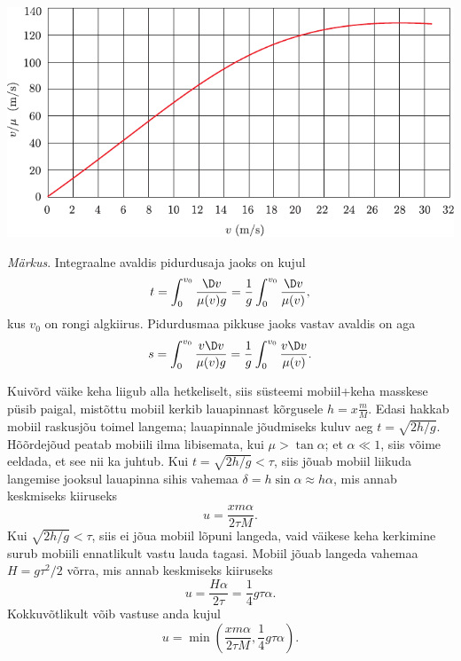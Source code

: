 \documentclass[10pt, twoside]{article}
\begin{document}
{\begin{center}
	\includegraphics[width=\linewidth]{2006-lahg-10-lah2}
\end{center}

\emph{Märkus}. Integraalne avaldis pidurdusaja jaoks on kujul
\[
t=\int_{0}^{v_{0}} \frac{\D v}{\mu(v) g}=\frac{1}{g} \int_{0}^{v_{0}} \frac{\D v}{\mu(v)},
\]
kus $v_0$ on rongi algkiirus. Pidurdusmaa pikkuse jaoks vastav avaldis on aga
\[
s=\int_{0}^{v_{0}} \frac{v \D v}{\mu(v) g}=\frac{1}{g} \int_{0}^{v_{0}} \frac{v \D v}{\mu(v)}.
\]
\probend
\bigskip


\solu
Kuivõrd väike keha liigub alla hetkeliselt, siis süsteemi mobiil+keha masskese püsib paigal, mistõttu mobiil kerkib lauapinnast kõrgusele $h=x\frac mM$.
Edasi hakkab mobiil raskusjõu toimel langema; lauapinnale jõudmiseks kuluv aeg $t=\sqrt{2h/g}$. Hõõrdejõud peatab mobiili ilma libisemata, kui $\mu>\tan\alpha$; et
$\alpha \ll 1$, siis võime eeldada, et see nii ka juhtub. Kui $t=\sqrt{2h/g}<\tau$, siis jõuab mobiil liikuda langemise jooksul lauapinna sihis vahemaa $\delta=h\sin\alpha\approx h\alpha$,
mis annab keskmiseks kiiruseks $$u=\frac{xm\alpha}{2\tau M}.$$ Kui $\sqrt{2h/g}<\tau$, siis ei jõua mobiil lõpuni langeda, vaid väikese keha kerkimine surub mobiili ennatlikult vastu lauda tagasi.
Mobiil jõuab langeda vahemaa $H=g\tau^2/2$ võrra, mis annab keskmiseks kiiruseks
$$u=\frac{H\alpha}{2\tau}=\frac 14 g\tau\alpha.$$
Kokkuvõtlikult võib vastuse anda kujul
$$u=\min\left(\frac{xm\alpha}{2\tau M}, \frac 14 g\tau\alpha\right).$$
\probend
\bigskip


}
\end{document}
